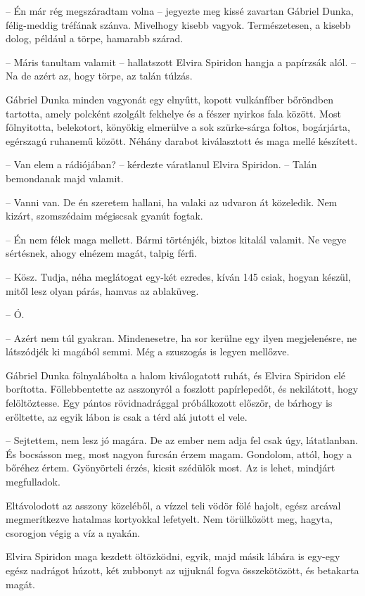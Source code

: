 \documentclass{IEEEtran}
\begin{document}
– Én már rég megszáradtam volna – jegyezte meg kissé zavartan Gábriel Dunka,
félig-meddig tréfának szánva. Mivelhogy kisebb vagyok. Természetesen, a kisebb
dolog, például a törpe, hamarabb szárad.

– Máris tanultam valamit – hallatszott Elvira Spiridon hangja a papírzsák
alól. – Na de azért az, hogy törpe, az talán túlzás.

Gábriel Dunka minden vagyonát egy elnyűtt, kopott vulkánfíber bőröndben
tartotta, amely polcként szolgált fekhelye és a fészer nyirkos fala között.
Most fölnyitotta, belekotort, könyökig elmerülve a sok szürke-sárga foltos,
bogárjárta, egérszagú ruhanemű között. Néhány darabot kiválasztott és maga
mellé készített.

– Van elem a rádiójában? – kérdezte váratlanul Elvira Spiridon. – Talán
bemondanak majd valamit.

– Vanni van. De én szeretem hallani, ha valaki az udvaron át közeledik. Nem
kizárt, szomszédaim mégiscsak gyanút fogtak.

– Én nem félek maga mellett. Bármi történjék, biztos kitalál valamit. Ne vegye
sértésnek, ahogy elnézem magát, talpig férfi.

– Kösz. Tudja, néha meglátogat egy-két ezredes, kíván 145 csiak, hogyan készül,
mitől lesz olyan párás, hamvas az ablaküveg.

– Ó.

– Azért nem túl gyakran. Mindenesetre, ha sor kerülne egy ilyen megjelenésre,
ne látszódjék ki magából semmi. Még a szuszogás is legyen mellőzve.

Gábriel Dunka fölnyalábolta a halom kiválogatott ruhát, és Elvira Spiridon elé
borította. Föllebbentette az asszonyról a foszlott papírlepedőt, és
nekilátott, hogy felöltöztesse. Egy pántos rövidnadrággal próbálkozott
először, de bárhogy is erőltette, az egyik lábon is csak a térd alá jutott el
vele.

– Sejtettem, nem lesz jó magára. De az ember nem adja fel csak úgy,
látatlanban. És bocsásson meg, most nagyon furcsán érzem magam. Gondolom,
attól, hogy a bőréhez értem. Gyönyörteli érzés, kicsit szédülök most. Az is
lehet, mindjárt megfulladok.

Eltávolodott az asszony közeléből, a vízzel teli vödör fölé hajolt, egész
arcával megmerítkezve hatalmas kortyokkal lefetyelt. Nem törülközött meg,
hagyta, csorogjon végig a víz a nyakán.

Elvira Spiridon maga kezdett öltözködni, egyik, majd másik lábára is egy-egy
egész nadrágot húzott, két zubbonyt az ujjuknál fogva összekötözött, és
betakarta magát.
\end{document}
